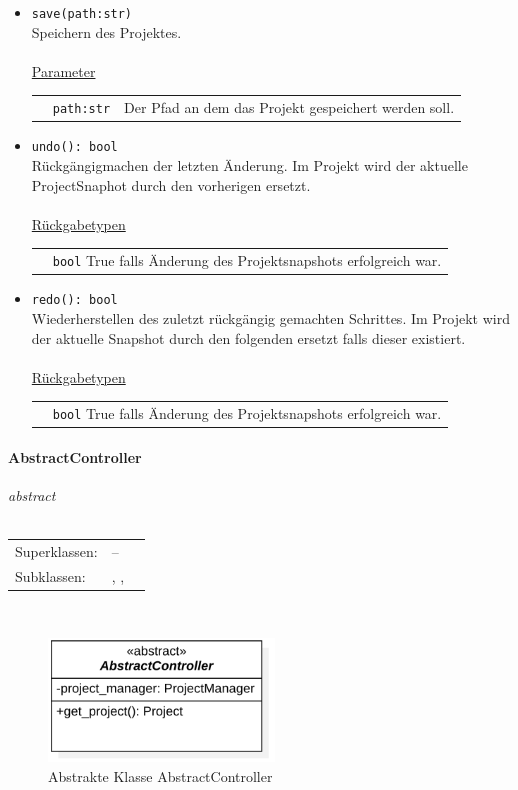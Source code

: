 \documentclass{article}
\newcommand{\classheader}[2][]{\paragraph{#2}
\mbox{}\textit{#1}\\\\}
\newcommand{\classref}[1]{\texttt{\nameref{cls:#1}}}
\begin{document}
\begin{itemize}
\item \texttt{save(path:str)}\\ Speichern des Projektes.\\\\
\underline{{Parameter}}\\
\begin{tabular}{lll}
 & \texttt{path:str} & Der Pfad an dem das Projekt gespeichert werden soll. \\
\end{tabular}
\item \texttt{undo(): bool}\\ Rückgängigmachen der letzten Änderung. Im Projekt wird der aktuelle ProjectSnaphot durch den vorherigen ersetzt.\\\\
\underline{{Rückgabetypen}}\\
\begin{tabular}{lp{10.7cm}}
 & \texttt{bool}  True falls Änderung des Projektsnapshots erfolgreich war.\\
\end{tabular}
\item \texttt{redo(): bool}\\ Wiederherstellen des zuletzt rückgängig gemachten Schrittes. Im Projekt wird der aktuelle Snapshot durch den folgenden ersetzt falls dieser existiert.\\\\
\underline{{Rückgabetypen}}\\
\begin{tabular}{lp{10.7cm}}
 & \texttt{bool}  True falls Änderung des Projektsnapshots erfolgreich war.\\
\end{tabular}
\end{itemize}


\newpage
\classheader[\flqq{}abstract\frqq]{AbstractController}\label{cls:AbstractController}
\begin{tabular}{lll}
 Superklassen: & -- \\
 Subklassen: & \classref{FunctionController}, \classref{EvaluationController}, \classref{ConfigurationController}
\end{tabular}\\
\begin{figure}[H]%
    \centering
    \includegraphics[width=6cm]{docs/entwurf/Floriane/AbstractController.png}
    \caption{Abstrakte Klasse AbstractController}
\end{figure}
\end{document}
